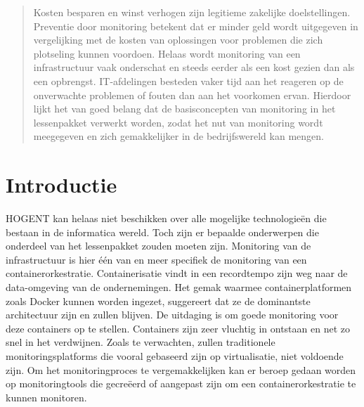\documentclass[a0,portrait]{a0poster}
\begin{document}
\begin{multicols}{2} %

\color{HoGentAccent1} %
%
\begin{abstract}
Kosten besparen en winst verhogen zijn legitieme zakelijke doelstellingen. Preventie door monitoring betekent dat er minder geld wordt uitgegeven in vergelijking met de kosten van oplossingen voor problemen die zich plotseling kunnen voordoen. Helaas wordt monitoring van een infrastructuur vaak onderschat en steeds eerder als een kost gezien dan als een opbrengst. IT-afdelingen besteden vaker tijd aan het reageren op de onverwachte problemen of fouten dan aan het voorkomen ervan. Hierdoor lijkt het van goed belang dat de basisconcepten van monitoring in het lessenpakket verwerkt worden, zodat het nut van monitoring wordt meegegeven en zich gemakkelijker in de bedrijfswereld kan mengen.
\end{abstract}

\color{HoGentAccent1} 
\section*{Introductie}
\color{black}
\color{black}

HOGENT kan helaas niet beschikken over alle mogelijke technologieën die bestaan in de informatica wereld. Toch zijn er bepaalde onderwerpen die onderdeel van het lessenpakket zouden moeten zijn. Monitoring van de infrastructuur is hier één van en meer specifiek de monitoring van een containerorkestratie. Containerisatie vindt in een recordtempo zijn weg naar de data-omgeving van de ondernemingen. Het gemak waarmee containerplatformen zoals Docker kunnen worden ingezet, suggereert dat ze de dominantste architectuur zijn en zullen blijven. De uitdaging is om goede monitoring voor deze containers op te stellen. Containers zijn zeer vluchtig in ontstaan en net zo snel in het verdwijnen. Zoals te verwachten, zullen traditionele monitoringsplatforms die vooral gebaseerd zijn op virtualisatie, niet voldoende zijn.  Om het monitoringproces te vergemakkelijken kan er beroep gedaan worden op monitoringtools die gecreëerd of aangepast zijn om een containerorkestratie te kunnen monitoren.


\end{multicols}
\end{document}
